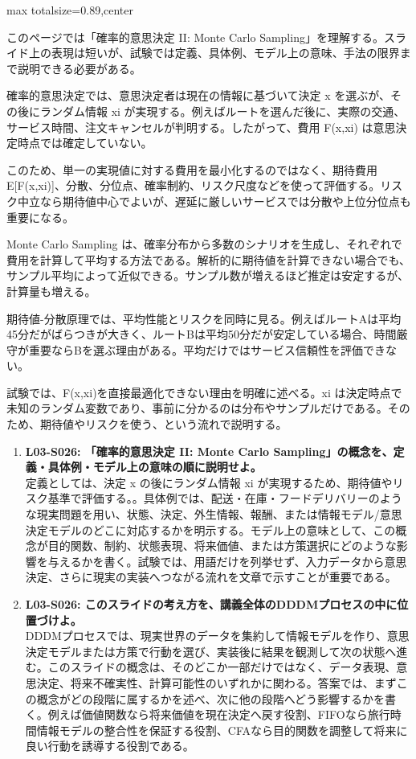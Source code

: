 \begin{minipage}[t]{0.58\textwidth}
\begin{adjustbox}{max totalsize={\textwidth}{0.89\textheight},center}
\begin{minipage}{\textwidth}\scriptsize
{}このページでは「確率的意思決定 II: Monte Carlo Sampling」を理解する。スライド上の表現は短いが、試験では定義、具体例、モデル上の意味、手法の限界まで説明できる必要がある。\par
確率的意思決定では、意思決定者は現在の情報に基づいて決定 x を選ぶが、その後にランダム情報 xi が実現する。例えばルートを選んだ後に、実際の交通、サービス時間、注文キャンセルが判明する。したがって、費用 F(x,xi) は意思決定時点では確定していない。\par
このため、単一の実現値に対する費用を最小化するのではなく、期待費用 E[F(x,xi)]、分散、分位点、確率制約、リスク尺度などを使って評価する。リスク中立なら期待値中心でよいが、遅延に厳しいサービスでは分散や上位分位点も重要になる。\par
Monte Carlo Sampling は、確率分布から多数のシナリオを生成し、それぞれで費用を計算して平均する方法である。解析的に期待値を計算できない場合でも、サンプル平均によって近似できる。サンプル数が増えるほど推定は安定するが、計算量も増える。\par
期待値-分散原理では、平均性能とリスクを同時に見る。例えばルートAは平均45分だがばらつきが大きく、ルートBは平均50分だが安定している場合、時間厳守が重要ならBを選ぶ理由がある。平均だけではサービス信頼性を評価できない。\par
試験では、F(x,xi)を直接最適化できない理由を明確に述べる。xi は決定時点で未知のランダム変数であり、事前に分かるのは分布やサンプルだけである。そのため、期待値やリスクを使う、という流れで説明する。\par{}\begin{enumerate}\item \textbf{L03-S026: 「確率的意思決定 II: Monte Carlo Sampling」の概念を、定義・具体例・モデル上の意味の順に説明せよ。}\\定義としては、決定 x の後にランダム情報 xi が実現するため、期待値やリスク基準で評価する。。具体例では、配送・在庫・フードデリバリーのような現実問題を用い、状態、決定、外生情報、報酬、または情報モデル/意思決定モデルのどこに対応するかを明示する。モデル上の意味として、この概念が目的関数、制約、状態表現、将来価値、または方策選択にどのような影響を与えるかを書く。試験では、用語だけを列挙せず、入力データから意思決定、さらに現実の実装へつながる流れを文章で示すことが重要である。\item \textbf{L03-S026: このスライドの考え方を、講義全体のDDDMプロセスの中に位置づけよ。}\\DDDMプロセスでは、現実世界のデータを集約して情報モデルを作り、意思決定モデルまたは方策で行動を選び、実装後に結果を観測して次の状態へ進む。このスライドの概念は、そのどこか一部だけではなく、データ表現、意思決定、将来不確実性、計算可能性のいずれかに関わる。答案では、まずこの概念がどの段階に属するかを述べ、次に他の段階へどう影響するかを書く。例えば価値関数なら将来価値を現在決定へ戻す役割、FIFOなら旅行時間情報モデルの整合性を保証する役割、CFAなら目的関数を調整して将来に良い行動を誘導する役割である。\end{enumerate}

\end{minipage}
\end{adjustbox}
\end{minipage}
